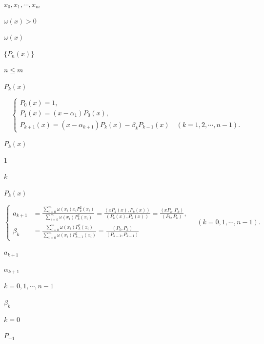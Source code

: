 \documentclass[UTF8,fontset=fandol,a4paper]{ctexart}
\begin{document}
\noindent $x_0,x_1,\cdots,x_m$\par

\noindent $\omega(x)>0$\par

\noindent $\omega(x)$\par

\noindent $\{P_n(x)\}$\par

\noindent $n\leqslant m$\par

\noindent $P_k(x)$\par

\[
\begin{cases}
P_0(x)=1,\\
P_1(x)=(x-\alpha_1)P_0(x),\\
P_{k+1}(x)=(x-\alpha_{k+1})P_k(x)-\beta_kP_{k-1}(x)\quad(k=1,2,\cdots,n-1).
\end{cases}\tag{3.6.10}
\]

\noindent $P_k(x)$\par

\noindent $1$\par

\noindent $k$\par

\noindent $P_k(x)$\par

\[
\left\{\begin{aligned}
a_{k+1}&=\frac{\displaystyle\sum_{i=0}^m\omega(x_i)x_iP_k^2(x_i)}{\displaystyle\sum_{i=0}^m\omega(x_i)P_k^2(x_i)}=\frac{(xP_k(x),P_k(x))}{(P_k(x),P_k(x))}=\frac{(xP_k,P_k)}{(P_k,P_k)},\\
\beta_k&=\frac{\displaystyle\sum_{i=0}^m\omega(x_i)P_k^2(x_i)}{\displaystyle\sum_{i=0}^m\omega(x_i)P_{k-1}^2(x_i)}=\frac{(P_k,P_k)}{(P_{k-1},P_{k-1})}
\end{aligned}\right.\quad(k=0,1,\cdots,n-1).\tag{3.6.11}
\]

\noindent $a_{k+1}$\par

\noindent $\alpha_{k+1}$\par

\noindent $k=0,1,\cdots,n-1$\par

\noindent $\beta_k$\par

\noindent $k=0$\par

\noindent $P_{-1}$\par
\end{document}
